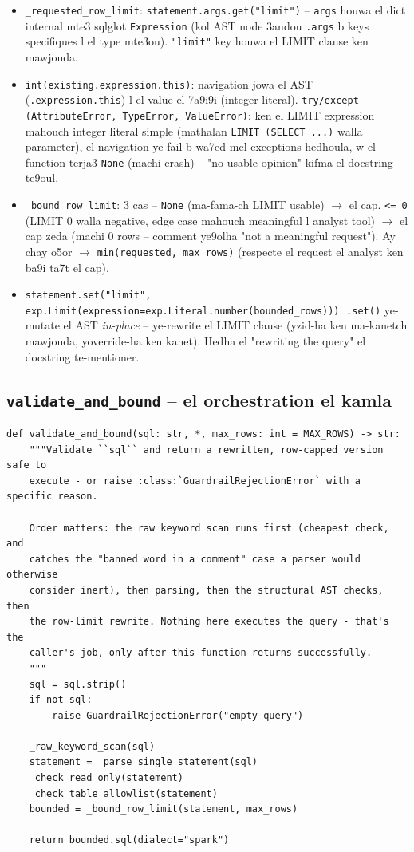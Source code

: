 \documentclass[11pt,a4paper]{report}
\DeclareRobustCommand{\code}[1]{\texttt{#1}}
\begin{document}
\begin{itemize}
  \item \code{\_requested\_row\_limit}: \code{statement.args.get("limit")}
        -- \code{args} houwa el dict internal mte3 sqlglot \code{Expression}
        (kol AST node 3andou \code{.args} b keys specifiques l el type
        mte3ou). \code{"limit"} key houwa el LIMIT clause ken mawjouda.
  \item \code{int(existing.expression.this)}: navigation jowa el AST
        (\code{.expression.this}) l el value el 7a9i9i (integer literal).
        \code{try/except (AttributeError, TypeError, ValueError)}: ken
        el LIMIT expression mahouch integer literal simple (mathalan
        \code{LIMIT (SELECT ...)} walla parameter), el navigation ye-fail
        b wa7ed mel exceptions hedhoula, w el function terja3 \code{None}
        (machi crash) -- "no usable opinion" kifma el docstring te9oul.
  \item \code{\_bound\_row\_limit}: 3 cas -- \code{None} (ma-fama-ch
        LIMIT usable) $\to$ el cap. \code{<= 0} (LIMIT 0 walla negative,
        edge case mahouch meaningful l analyst tool) $\to$ el cap zeda
        (machi 0 rows -- comment ye9olha "not a meaningful request").
        Ay chay o5or $\to$ \code{min(requested, max\_rows)} (respecte
        el request el analyst ken ba9i ta7t el cap).
  \item \code{statement.set("limit", exp.Limit(expression=exp.Literal.number(bounded\_rows)))}:
        \code{.set()} ye-mutate el AST \emph{in-place} -- ye-rewrite el
        LIMIT clause (yzid-ha ken ma-kanetch mawjouda, yoverride-ha ken
        kanet). Hedha el "rewriting the query" el docstring te-mentioner.
\end{itemize}

\subsection{\code{validate\_and\_bound} -- el orchestration el kamla}

\begin{lstlisting}[style=pystyle]
def validate_and_bound(sql: str, *, max_rows: int = MAX_ROWS) -> str:
    """Validate ``sql`` and return a rewritten, row-capped version safe to
    execute - or raise :class:`GuardrailRejectionError` with a specific reason.

    Order matters: the raw keyword scan runs first (cheapest check, and
    catches the "banned word in a comment" case a parser would otherwise
    consider inert), then parsing, then the structural AST checks, then
    the row-limit rewrite. Nothing here executes the query - that's the
    caller's job, only after this function returns successfully.
    """
    sql = sql.strip()
    if not sql:
        raise GuardrailRejectionError("empty query")

    _raw_keyword_scan(sql)
    statement = _parse_single_statement(sql)
    _check_read_only(statement)
    _check_table_allowlist(statement)
    bounded = _bound_row_limit(statement, max_rows)

    return bounded.sql(dialect="spark")
\end{lstlisting}
\end{document}

